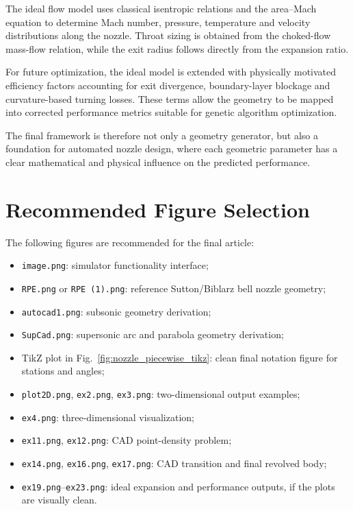 \documentclass[11pt,a4paper]{article}
\begin{document}
The ideal flow model uses classical isentropic relations and the area--Mach equation to determine Mach number, pressure, temperature and velocity distributions along the nozzle. Throat sizing is obtained from the choked-flow mass-flow relation, while the exit radius follows directly from the expansion ratio.

For future optimization, the ideal model is extended with physically motivated efficiency factors accounting for exit divergence, boundary-layer blockage and curvature-based turning losses. These terms allow the geometry to be mapped into corrected performance metrics suitable for genetic algorithm optimization.

The final framework is therefore not only a geometry generator, but also a foundation for automated nozzle design, where each geometric parameter has a clear mathematical and physical influence on the predicted performance.

\appendix
\section{Recommended Figure Selection}

The following figures are recommended for the final article:
\begin{itemize}
    \item \texttt{image.png}: simulator functionality interface;
    \item \texttt{RPE.png} or \texttt{RPE (1).png}: reference Sutton/Biblarz bell nozzle geometry;
    \item \texttt{autocad1.png}: subsonic geometry derivation;
    \item \texttt{SupCad.png}: supersonic arc and parabola geometry derivation;
    \item TikZ plot in Fig.~\ref{fig:nozzle_piecewise_tikz}: clean final notation figure for stations and angles;
    \item \texttt{plot2D.png}, \texttt{ex2.png}, \texttt{ex3.png}: two-dimensional output examples;
    \item \texttt{ex4.png}: three-dimensional visualization;
    \item \texttt{ex11.png}, \texttt{ex12.png}: CAD point-density problem;
    \item \texttt{ex14.png}, \texttt{ex16.png}, \texttt{ex17.png}: CAD transition and final revolved body;
    \item \texttt{ex19.png}--\texttt{ex23.png}: ideal expansion and performance outputs, if the plots are visually clean.
\end{itemize}
\end{document}
